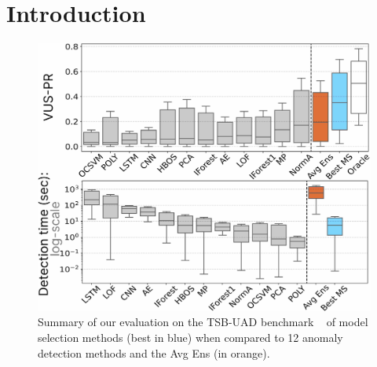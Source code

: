 \section{Introduction}

\begin{figure}
    \centering
    \vspace{1cm}
    \includegraphics[width=0.82\linewidth]{figures/1_intro_fig.jpg}
    \vspace{-0.3cm}
    \caption{Summary of our evaluation on the TSB-UAD benchmark ~\cite{10.14778/3529337.3529354} of model selection methods (best in blue) when compared to 12 anomaly detection methods and the Avg Ens (in orange).}
    \vspace{-0.3cm}
    \label{fig:intro_fig}
\end{figure}


